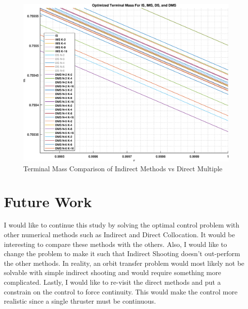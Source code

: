 \documentclass[]{article}
\begin{document}
\begin{figure}
	\centering
	\includegraphics[scale=0.50]{terminlMassCompareMinusDS.eps}
	\caption{Terminal Mass Comparison of Indirect Methods vs Direct Multiple}
	\label{fig:terminlMassCompareMinusDS}
\end{figure}

\section{Future Work}
I would like to continue this study by solving the optimal control problem with other numerical methods such as Indirect and Direct Collocation. It would be interesting to compare these methods with the others. Also, I would like to change the problem to make it such that Indirect Shooting doesn't out-perform the other methods. In reality, an orbit transfer problem would most likely not be solvable with simple indirect shooting and would require something more complicated. Lastly, I would like to re-visit the direct methods and put a constrain on the control to force continuity. This would make the control more realistic since a single thruster must be continuous. 
\end{document}
